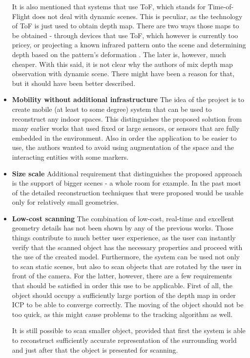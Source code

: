\documentclass[11pt, a4paper]{article}
\theoremstyle{plain}
\begin{document}
\begin{itemize}
      It is also mentioned that systems that use ToF, which stands for
      Time-of-Flight does not deal with dynamic scenes. This is peculiar, as the
      technology of ToF is just used to obtain depth map. There are two ways
      those maps to be obtained - through devices that use ToF, which however is
      currently too pricey, or projecting a known infrared pattern onto the
      scene and determining depth based on the pattern's deformation
      \cite{body-scanning}. The later is, however, much cheaper. With this said,
      it is not clear why the authors of \cite{kinectfusion} mix depth map
      observation with dynamic scene. There might have been a reason for that,
      but it should have been better described.
    \item \textbf{Mobility without additional infrastructure} The idea of the
      project is to create mobile (at least to some degree) system that can be
      used to reconstruct any indoor spaces. This distinguishes the proposed
      solution from many earlier works that used fixed or large sensors, or
      sensors that are fully embedded in the environment. Also in order the
      application to be easier to use, the authors wanted to avoid using
      augmentation of the space and the interacting entities with some markers.
    \item \textbf{Size scale} Additional requirement that distinguishes the
      proposed approach is the support of bigger scenes - a whole room for
      example. In the past most of the detailed reconstruction techniques that
      were proposed would be usable only for relatively small geometries.
    \item \textbf{Low-cost scanning} The combination of low-cost, real-time and
      excellent geometry details has not been shown by any of the previous
      works. Those things contribute to much better user experience, as the user
      can instantly verify that the scanned object has the necessary properties
      and proceed with the use of the created model. Furthermore, the system can
      be used not only to scan static scenes, but also to scan objects that are
      rotated by the user in front of the camera. For the latter, however, there
      are a few requirements that should be satisfied in order this use to be
      applicable. First of all, the object should occupy a sufficiently large
      portion of the depth map in order ICP to be able to converge correctly.
      The moving of the object should not be too quick, as this might cause
      problems to the tracking algorithm as well.

      It is still possible to scan smaller object, provided that first the
      system is able to reconstruct sufficiently accurate representation of the
      surrounding world and just after that the object is presented for
      scanning.
  \end{itemize}
\end{document}
